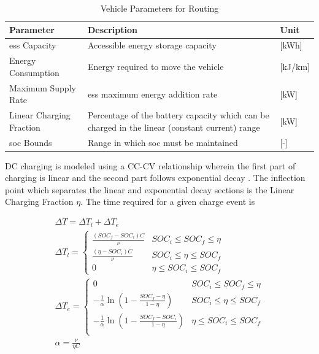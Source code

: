 \documentclass[11pt]{article}
\begin{document}
\begin{multicols}{2}
\begin{table}[H]
	\centering
	\caption{Vehicle Parameters for Routing}
	\label{tab:param_veh}
	\begin{tabular}{|C{/8}|C{/8}|C{/8}|}
		\hline Parameter & Description & Unit \\
		\hline \gls{ess} Capacity & Accessible energy storage capacity & [kWh] \\
		\hline Energy Consumption & Energy required to move the vehicle & [kJ/km] \\
		\hline Maximum Supply Rate & \gls{ess} maximum energy addition rate & [kW] \\
		\hline Linear Charging Fraction & Percentage of the battery capacity which can be charged in the linear (constant current) range & [kW] \\
		\hline \gls{soc} Bounds & Range in which \gls{soc} must be maintained & [-] \\
		\hline
	\end{tabular}
\end{table}

DC charging is modeled using a CC-CV relationship wherein the first part of charging is linear and the second part follows exponential decay \cite{Marra_2012}. The inflection point which separates the linear and exponential decay sections is the Linear Charging Fraction $\eta$. The time required for a given charge event is

\begin{gather}
	\Delta T = \Delta T_{l} + \Delta T_{e} \\
	\Delta T_{l} = \begin{cases}
		\frac{(SOC_f - SOC_i) C}{\nu} &  SOC_i \leq SOC_f \leq \eta \\
		\frac{(\eta - SOC_i) C}{\nu} &  SOC_i \leq \eta \leq SOC_f \\
		0 &  \eta \leq SOC_i \leq SOC_f
	\end{cases} \\
	\Delta T_{e} = \begin{cases}
		0 & SOC_i \leq SOC_f \leq \eta \\
		-\frac{1}{\alpha}\ln{\left(1-\frac{SOC_f - \eta}{1-\eta}\right)} &  SOC_i \leq \eta \leq SOC_f \\
		-\frac{1}{\alpha}\ln{\left(1-\frac{SOC_f - SOC_i}{1-\eta}\right)} &  \eta \leq SOC_i \leq SOC_f \\
	\end{cases} \\
	\alpha = \frac{\nu}{\eta C}
\end{gather}


\end{multicols}
\end{document}
